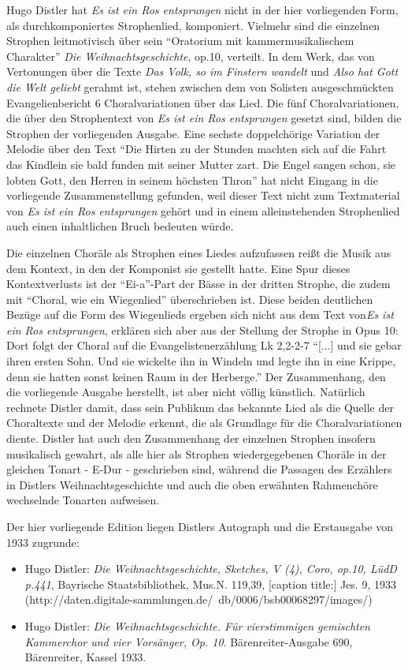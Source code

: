 Hugo Distler hat \emph{Es ist ein Ros entsprungen} nicht in der hier vorliegenden Form, als durchkomponiertes Strophenlied, komponiert. Vielmehr sind die einzelnen Strophen leitmotivisch über sein \enquote{Oratorium mit kammermusikalischem Charakter} \emph{Die Weihnachtsgeschichte}, op.10, verteilt. In dem Werk, das von Vertonungen über die Texte \emph{Das Volk, so im Finstern wandelt} und \emph{Also hat Gott die Welt geliebt} gerahmt ist, stehen zwischen dem von Solisten ausgeschmückten Evangelienbericht 6 Choralvariationen über das Lied. Die fünf Choralvariationen, die über den Strophentext von \emph{Es ist ein Ros entsprungen} gesetzt sind, bilden die Strophen der vorliegenden Ausgabe. Eine sechste doppelchörige Variation der Melodie über den Text \enquote{Die Hirten zu der Stunden machten sich auf die Fahrt das Kindlein sie bald funden mit seiner Mutter zart. Die Engel sangen schon, sie lobten Gott, den Herren in seinem höchsten Thron} hat nicht Eingang in die vorliegende Zusammenstellung gefunden, weil dieser Text nicht zum Textmaterial von \emph{Es ist ein Ros entsprungen} gehört und in einem alleinstehenden Strophenlied auch einen inhaltlichen Bruch bedeuten würde.

Die einzelnen Choräle als Strophen eines Liedes aufzufassen reißt die Musik aus dem Kontext, in den der Komponist sie gestellt hatte. Eine Spur dieses Kontextverlusts ist der \enquote{Ei-a}-Part der Bässe in der dritten Strophe, die zudem mit \enquote{Choral, wie ein Wiegenlied} überschrieben ist. Diese beiden deutlichen Bezüge auf die Form des Wiegenlieds ergeben sich nicht aus dem Text von\emph{Es ist ein Ros entsprungen}, erklären sich aber aus der Stellung der Strophe in Opus 10: Dort folgt der Choral auf die Evangelistenerzählung Lk 2,2-2-7 \enquote{[...] und sie gebar ihren ersten Sohn. Und sie wickelte ihn in Windeln und legte ihn in eine Krippe, denn sie hatten sonst keinen Raum in der Herberge.}
Der Zusammenhang, den die vorliegende Ausgabe herstellt, ist aber nicht völlig künstlich. Natürlich rechnete Distler damit, dass sein Publikum das bekannte Lied als die Quelle der Choraltexte und der Melodie erkennt, die als Grundlage für die Choralvariationen diente. Distler hat auch den Zusammenhang der einzelnen Strophen insofern musikalisch gewahrt, als alle hier als Strophen wiedergegebenen Choräle in der gleichen Tonart - E-Dur - geschrieben sind, während die Passagen des Erzählers in Distlers Weihnachtsgeschichte und auch die oben erwähnten Rahmenchöre wechselnde Tonarten aufweisen.

Der hier vorliegende Edition liegen Distlers Autograph und die Erstausgabe von 1933 zugrunde: 
\begin{itemize}
	\item Hugo Distler: \emph{Die Weihnachtsgeschichte, Sketches, V (4), Coro, op.10, LüdD p.441}, Bayrische Staatsbibliothek, Mus.N. 119,39, [caption title:] Jes. 9, 1933 (http://daten.digitale-sammlungen.de/~db/0006/bsb00068297/images/)
	\item Hugo Distler: \emph{Die Weihnachtsgeschichte. Für vierstimmigen gemischten Kammerchor und vier Vorsänger, Op. 10}. Bärenreiter-Ausgabe 690, Bärenreiter, Kassel 1933. 
\end{itemize}

